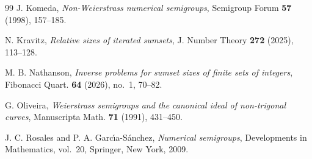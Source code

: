 \documentclass[11pt]{amsart}
\theoremstyle{definition}
\theoremstyle{remark}
\numberwithin{equation}{section}
\begin{document}
\begin{thebibliography}{99}
J. Komeda, \emph{Non-Weierstrass numerical semigroups}, Semigroup Forum \textbf{57} (1998), 157--185.

N. Kravitz, \emph{Relative sizes of iterated sumsets}, J. Number Theory \textbf{272} (2025), 113--128.

M. B. Nathanson, \emph{Inverse problems for sumset sizes of finite sets of integers}, Fibonacci Quart. \textbf{64} (2026), no.~1, 70--82.

G. Oliveira, \emph{Weierstrass semigroups and the canonical ideal of non-trigonal curves}, Manuscripta Math. \textbf{71} (1991), 431--450.

J. C. Rosales and P. A. Garc\'{\i}a-S\'anchez, \emph{Numerical semigroups}, Developments in Mathematics, vol.~20, Springer, New York, 2009.

\end{thebibliography}
\end{document}
